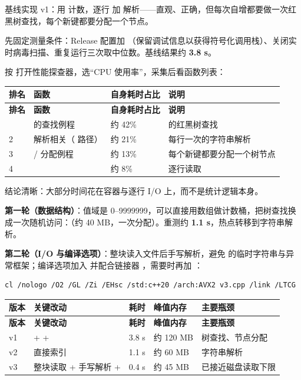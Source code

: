 基线实现 v1：用  计数，逐行  加  解析——直观、正确，但每次自增都要做一次红黑树查找，每个新键都要分配一个节点。

先固定测量条件：Release 配置加 （保留调试信息以获得符号化调用栈）、关闭实时病毒扫描、重复运行三次取中位数。基线结果约 \textbf{3.8 s}。

按  打开性能探查器，选“CPU 使用率”，采集后看函数列表：

\begin{longtable}{L{1.4cm}L{5.4cm}L{3.0cm}L{4.4cm}}
\toprule \textbf{排名} & \textbf{函数} & \textbf{自身耗时占比} & \textbf{说明} \\ \midrule
\endfirsthead
\toprule \textbf{排名} & \textbf{函数} & \textbf{自身耗时占比} & \textbf{说明} \\ \midrule
\endhead
\bottomrule {} &  的查找例程 & 约 42\% &  的红黑树查找 \\
2 & 解析相关（ 路径） & 约 21\% & 每行一次的字符串解析 \\
3 &  / 分配例程 & 约 13\% & 每个新键都要分配一个树节点 \\
4 &  & 约 8\% & 逐行读取 \\
\end{longtable}

结论清晰：大部分时间花在容器与逐行 I/O 上，而不是统计逻辑本身。

\textbf{第一轮（数据结构）}：值域是 0--9999999，可以直接用数组做计数桶，把树查找换成一次随机访问：（约 40 MB，一次分配）。重测约 \textbf{1.1 s}，热点转移到字符串解析。

\textbf{第二轮（I/O 与编译选项）}：整块读入文件后手写解析，避免  的临时字符串与异常框架；编译选项加入  并配合链接器 ，需要时再加 ：

\begin{lstlisting}[style=shellstyle]
cl /nologo /O2 /GL /Zi /EHsc /std:c++20 /arch:AVX2 v3.cpp /link /LTCG
\end{lstlisting}

\begin{longtable}{L{1.3cm}L{5.5cm}L{1.6cm}L{2.4cm}L{3.0cm}}
\toprule \textbf{版本} & \textbf{关键改动} & \textbf{耗时} & \textbf{峰值内存} & \textbf{主要瓶颈} \\ \midrule
\endfirsthead
\toprule \textbf{版本} & \textbf{关键改动} & \textbf{耗时} & \textbf{峰值内存} & \textbf{主要瓶颈} \\ \midrule
\endhead
\bottomrule \endlastfoot
v1 &  +  +  & 3.8 s & 约 120 MB & 树查找、节点分配 \\
v2 &  直接索引 & 1.1 s & 约 60 MB & 字符串解析 \\
v3 & 整块读取 + 手写解析 +  & 0.4 s & 约 45 MB & 已接近磁盘读取下限 \\
\end{longtable}

